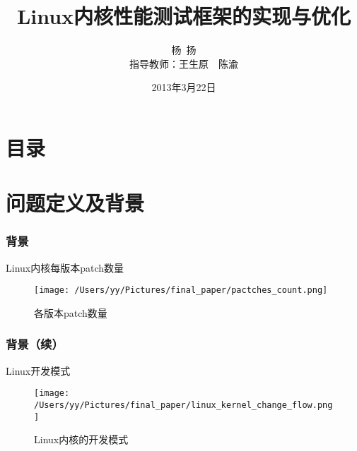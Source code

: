 \documentclass[xcolor=dvipsnames,11pt]{beamer}
\begin{document}
                                           

\title{Linux内核性能测试框架的实现与优化\\ {}}
\author[杨\ 扬]{杨\ 扬\\指导教师：王生原\ \ 陈渝}

\date{2013年3月22日}


\frame{\titlepage}

\section*{目录}                                %
\frame {
          \tableofcontents      %
}


\section{问题定义及背景}
\begin{frame}
\frametitle{背景}

\begin{block}{Linux内核每版本patch数量}
\begin{figure}[htp]
\centering
\texttt{[image: /Users/yy/Pictures/final\_paper/pactches\_count.png]}
\caption{各版本patch数量}
\label{}
\end{figure}
\end{block}
\end{frame}

\begin{frame}
\frametitle{背景（续）}

\begin{block}{Linux开发模式}
\begin{figure}[htp]
\centering
\texttt{[image: /Users/yy/Pictures/final\_paper/linux\_kernel\_change\_flow.png]}
\caption{Linux内核的开发模式}
\label{}
\end{figure}
\end{block}
\end{frame}
\end{document}
